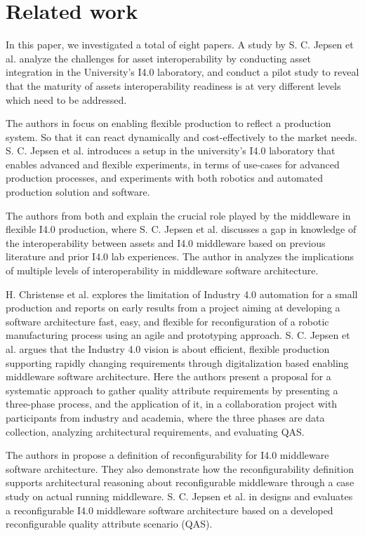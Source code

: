 \section{Related work}
\label{sec:related_work}
In this paper, we investigated a total of eight papers. A study \cite{PilotStudy} by S. C. Jepsen et al. analyze the challenges for asset interoperability by conducting asset integration in the University's I4.0 laboratory, and conduct a pilot study to reveal that the maturity of assets interoperability readiness is at very different levels which need to be addressed. 

The authors in \cite{ResearchSetup} focus on enabling flexible production to reflect a production system. So that it can react dynamically and cost-effectively to the market needs. S. C. Jepsen et al. introduces a setup in the university's I4.0 laboratory that enables advanced and flexible experiments, in terms of use-cases for advanced production processes, and experiments with both robotics and automated production solution and software.

The authors from both \cite{analysisInterop} and \cite{AnalyticalModelInterOP} explain the crucial role played by the middleware in flexible I4.0 production, where S. C. Jepsen et al. \cite{analysisInterop} discusses a gap in knowledge of the interoperability between assets and I4.0 middleware based on previous literature and prior I4.0 lab experiences. The author in \cite{AnalyticalModelInterOP} analyzes the implications of multiple levels of interoperability in middleware software architecture.

H. Christense et al. \cite{agileArchitecting40} explores the limitation of Industry 4.0 automation for a small production and reports on early results from a project aiming at developing a software architecture fast, easy, and flexible for reconfiguration of a robotic manufacturing process using an agile and prototyping approach. S. C. Jepsen et al. \cite{ExperienceReport} argues that the Industry 4.0 vision is about efficient, flexible production supporting rapidly changing requirements through digitalization based enabling middleware software architecture. Here the authors present a proposal for a systematic approach to gather quality attribute requirements by presenting a three-phase process, and the application of it, in a collaboration project with participants from industry and academia, where the three phases are data collection, analyzing architectural requirements, and evaluating QAS.

The authors in \cite{ProductivityProductionSystem} propose a definition of reconfigurability for I4.0 middleware software architecture. They also demonstrate how the reconfigurability definition supports architectural reasoning about reconfigurable middleware through a case study on actual running middleware. S. C. Jepsen et al. in \cite{ReconfigureableIndustry} designs and evaluates a reconfigurable I4.0 middleware software architecture based on a developed reconfigurable quality attribute scenario (QAS).
